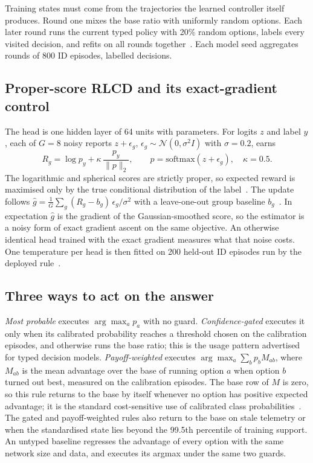 \documentclass[10pt]{article}
\begin{document}
Training states must come from the trajectories the learned controller itself produces. Round one mixes the base ratio with uniformly random options. Each later round runs the current typed policy with 20\% random options, labels every visited decision, and refits on all rounds together~\cite{ross2011dagger}. Each model seed aggregates \TypedRounds{} rounds of 800 ID episodes, \TypedTrainRows{} labelled decisions.

\subsection{Proper-score RLCD and its exact-gradient control}
The head is one hidden layer of 64 units with \TypedParameters{} parameters. For logits $z$ and label $y$, each of $G=8$ noisy reports $z+\epsilon_g$, $\epsilon_g\sim\mathcal N(0,\sigma^2 I)$ with $\sigma=0.2$, earns
\begin{equation}
R_g=\log p_y+\kappa\,\frac{p_y}{\lVert p\rVert_2},\qquad p=\mathrm{softmax}(z+\epsilon_g),\quad \kappa=0.5 .
\end{equation}
The logarithmic and spherical scores are strictly proper, so expected reward is maximised only by the true conditional distribution of the label~\cite{gneiting2007scoring}. The update follows $\hat g=\frac{1}{G}\sum_g (R_g-b_g)\,\epsilon_g/\sigma^2$ with a leave-one-out group baseline $b_g$~\cite{williams1992reinforce}. In expectation $\hat g$ is the gradient of the Gaussian-smoothed score, so the estimator is a noisy form of exact gradient ascent on the same objective. An otherwise identical head trained with the exact gradient measures what that noise costs. One temperature per head is then fitted on 200 held-out ID episodes run by the deployed rule~\cite{guo2017calibration}.

\subsection{Three ways to act on the answer}
\emph{Most probable} executes $\arg\max_a p_a$ with no guard. \emph{Confidence-gated} executes it only when its calibrated probability reaches a threshold chosen on the calibration episodes, and otherwise runs the base ratio; this is the usage pattern advertised for typed decision models. \emph{Payoff-weighted} executes $\arg\max_a \sum_b p_b M_{ab}$, where $M_{ab}$ is the mean advantage over the base of running option $a$ when option $b$ turned out best, measured on the calibration episodes. The base row of $M$ is zero, so this rule returns to the base by itself whenever no option has positive expected advantage; it is the standard cost-sensitive use of calibrated class probabilities~\cite{elkan2001cost}. The gated and payoff-weighted rules also return to the base on stale telemetry or when the standardised state lies beyond the 99.5th percentile of training support. An untyped baseline regresses the advantage of every option with the same network size and data, and executes its argmax under the same two guards.
\end{document}
